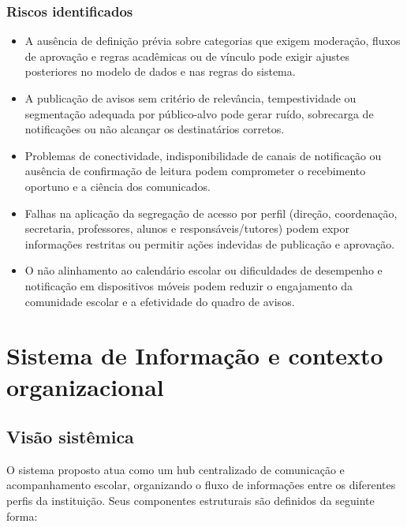 \documentclass[a4paper,12pt]{report}
\begin{document}
\subsection{Riscos identificados}
\begin{itemize}
    \item A ausência de definição prévia sobre categorias que exigem moderação, fluxos de aprovação e regras acadêmicas ou de vínculo pode exigir ajustes posteriores no modelo de dados e nas regras do sistema.
    \item A publicação de avisos sem critério de relevância, tempestividade ou segmentação adequada por público-alvo pode gerar ruído, sobrecarga de notificações ou não alcançar os destinatários corretos.
    \item Problemas de conectividade, indisponibilidade de canais de notificação ou ausência de confirmação de leitura podem comprometer o recebimento oportuno e a ciência dos comunicados.
    \item Falhas na aplicação da segregação de acesso por perfil (direção, coordenação, secretaria, professores, alunos e responsáveis/tutores) podem expor informações restritas ou permitir ações indevidas de publicação e aprovação.
    \item O não alinhamento ao calendário escolar ou dificuldades de desempenho e notificação em dispositivos móveis podem reduzir o engajamento da comunidade escolar e a efetividade do quadro de avisos.
\end{itemize}

\chapter{Sistema de Informação e contexto organizacional}

\section{Visão sistêmica}

O sistema proposto atua como um hub centralizado de comunicação e acompanhamento escolar, organizando o fluxo de informações entre os diferentes perfis da instituição. Seus componentes estruturais são definidos da seguinte forma:
\end{document}
